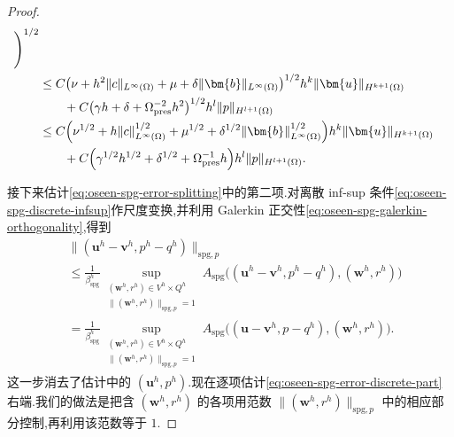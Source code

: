 \begin{proof}
\begin{equation}
\begin{aligned}
       \Biggr)^{1/2}\\
 &\le C\bigl(\nu+h^2\|c\|_{L^\infty(\Omega)}
             +\mu+\delta\|\bm{b}\|_{L^\infty(\Omega)}\bigr)^{1/2}
             h^k\|\bm{u}\|_{H^{k+1}(\Omega)}\\
 &\qquad+C\bigl(\gamma h+\delta
             +\Omega_{\mathrm{pres}}^{-2}h^2\bigr)^{1/2}
             h^l\|p\|_{H^{l+1}(\Omega)}\\
 &\le C\Bigl(\nu^{1/2}+h\|c\|_{L^\infty(\Omega)}^{1/2}
             +\mu^{1/2}
             +\delta^{1/2}\|\bm{b}\|_{L^\infty(\Omega)}^{1/2}\Bigr)
             h^k\|\bm{u}\|_{H^{k+1}(\Omega)}\\
 &\qquad+C\Bigl(\gamma^{1/2}h^{1/2}
             +\delta^{1/2}+\Omega_{\mathrm{pres}}^{-1}h\Bigr)
             h^l\|p\|_{H^{l+1}(\Omega)}.
\end{aligned}
\end{equation}

接下来估计\cref{eq:oseen-spg-error-splitting}中的第二项.对离散 inf-sup 条件\cref{eq:oseen-spg-discrete-infsup}作尺度变换,并利用 Galerkin 正交性\cref{eq:oseen-spg-galerkin-orthogonality},得到
\begin{equation}\label{eq:oseen-spg-error-discrete-part}
\begin{aligned}
 &\|(\bm{u}^h-\bm{v}^h,p^h-q^h)\|_{\mathrm{spg},p}\\
 &\le\frac{1}{\beta_{\mathrm{spg}}^h}
   \sup_{\substack{(\bm{w}^h,r^h)\in V^h\times Q^h\\
       \|(\bm{w}^h,r^h)\|_{\mathrm{spg},p}=1}}
   A_{\mathrm{spg}}\bigl((\bm{u}^h-\bm{v}^h,p^h-q^h),
                         (\bm{w}^h,r^h)\bigr)\\
 &=\frac{1}{\beta_{\mathrm{spg}}^h}
   \sup_{\substack{(\bm{w}^h,r^h)\in V^h\times Q^h\\
       \|(\bm{w}^h,r^h)\|_{\mathrm{spg},p}=1}}
   A_{\mathrm{spg}}\bigl((\bm{u}-\bm{v}^h,p-q^h),
                         (\bm{w}^h,r^h)\bigr).
\end{aligned}
\end{equation}
这一步消去了估计中的 $(\bm{u}^h,p^h)$.现在逐项估计\cref{eq:oseen-spg-error-discrete-part}右端.我们的做法是把含 $(\bm{w}^h,r^h)$ 的各项用范数 $\|(\bm{w}^h,r^h)\|_{\mathrm{spg},p}$ 中的相应部分控制,再利用该范数等于 $1$.


\end{proof}
